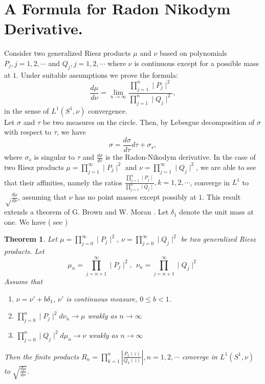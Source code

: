 \documentclass{amsart}
\newtheorem{Th}{Theorem}[section]
\theoremstyle{definition}
\theoremstyle{remark}
\numberwithin{equation}{section}
\newcommand{\1}{\mathbb{1}}
\begin{document}
\section{A Formula for Radon Nikodym Derivative.}

Consider two generalized Riesz products $\mu$ and $\nu $ based on polynomials $P_j, j=1,2,\cdots$ and $Q_j, j =1,2,\cdots$ where $\nu$ is continuous except for a possible mass at $1$. Under suitable assumptions we prove the formula:\\
$$  \frac{d\mu}{d\nu} =\lim_{n\rightarrow \infty}\frac{\prod_{j=1}^n \mid P_j\mid^2}{\prod_{j=1}^n\mid Q_j\mid^2},$$
in the sense of $L^1(S^1, \nu)$ convergence.\\
Let $\sigma$ and $\tau$ be two measures on the circle. Then, by Lebesgue decomposition of  $\sigma$ with respect to $\tau$, we have
\[
\sigma=\frac{d\sigma}{d\tau} d\tau+\sigma_s,
\]
where $\sigma_s$ is singular to $\tau$ and $\frac{d\sigma}{d\tau}$ is the Radon-Nikodym derivative. In the case of two Riesz products $ \mu = \prod_{j=1}^\infty\mid P_j\mid^2$ and $ \nu =\prod_{j=1}^\infty\mid Q_j\mid^2$, we are able to see  that  their affinities, namely the ratios $ \frac{\prod_{j=1}^n\mid P_j\mid}{\prod_{j=1}^n\mid Q_j\mid}, k=1,2,\cdots$,  converge in $L^1$ to $\sqrt\frac{d\mu}{d\nu}$, assuming that $\nu$ has no point masses except possibly at $1$. This result extends a theorem of G. Brown and W. Moran \cite{Brown-Moran}. Let $\delta_1$ denote the unit mass at one. We have ( see \cite{elabdal})

\begin{Th}\label{th6}
Let $ \mu=\prod_{j=0}^{\infty}\mid P_j\mid^2$,
  $ \nu=\prod_{j=0}^{\infty}\mid Q_j\mid^2$ be two generalized Riesz products. Let
  $$\mu_n=\prod_{j=n+1}^{\infty}\mid P_j\mid^2,~~
   \nu_n=\prod_{j=n+1}^{\infty}\mid Q_j\mid^2
  $$
Assume that
\begin{enumerate}
  \item  $\nu=\nu'+b\delta_1$, $\nu'$ is continuous measure, $0\leq b <1$.
  \item $ \prod_{j=0}^{n}\mid P_j\mid^2 d\nu_n \longrightarrow \mu$ weakly as $n\longrightarrow \infty$
  \item $ \prod_{j=0}^{n}\mid Q_j\mid^2 d\mu_n \longrightarrow \nu$ weakly as $n\longrightarrow \infty$
\end{enumerate}
Then the finite products $ R_n= \prod_{k=1}^{n}{\left|\frac{P_k(z)} {Q_k(z)}\right|}, n=1,2,\cdots$ converge in $L^1(S^1,\nu)$ to $\sqrt{\frac{d\mu}{d\nu}}$.
\end{Th}
\end{document}
